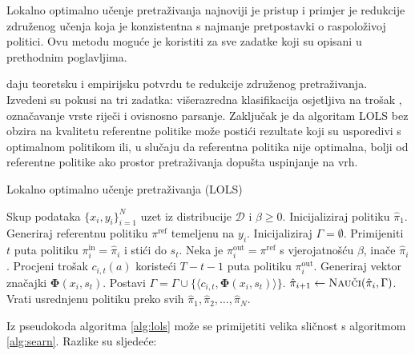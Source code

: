 Lokalno optimalno učenje pretraživanja 
najnoviji je pristup i primjer je redukcije združenog učenja koja je
konzistentna s najmanje pretpostavki o raspoloživoj politici. Ovu metodu moguće je
koristiti za sve zadatke koji su opisani u prethodnim poglavljima.

\cite{daume15lols} daju teoretsku i empirijsku potvrdu te redukcije združenog
pretraživanja. Izvedeni su pokusi na tri zadatka: višerazredna klasifikacija
osjetljiva na trošak ,
označavanje vrste riječi i ovisnosno parsanje. Zaključak je da algoritam
\textsc{LOLS} bez obzira na kvalitetu referentne politike može postići rezultate
koji su usporedivi s optimalnom politikom ili, u slučaju da referentna politika nije
optimalna, bolji od referentne politike ako prostor pretraživanja dopušta
uspinjanje na vrh.

\begin{algorithm}
\caption{Lokalno optimalno učenje pretraživanja (\textsc{LOLS})}\label{alg:lols}
\begin{algorithmic}[1]
\Require Skup podataka $\{x_i, y_i\}_{i=1}^N$ uzet iz distribucije $\mathcal{D}$
         i $\beta \geq 0$. %
\State Inicijaliziraj politiku $\hat{\pi}_1$.
  \State Generiraj referentnu politiku $\pi^{\text{ref}}$ temeljenu na $y_i$.
  \State Inicijaliziraj $\Gamma = \emptyset$. 
    \State Primijeniti $t$ puta politiku $\pi_{i}^{\text{in}} = \hat{\pi}_i$  i stići do $s_t$.  \label{alg:lols:learned}
      \State Neka je  $\pi_{i}^{\text{out}} = \pi^{\text{ref}}$ s vjerojatnošću $\beta$, inače $\hat{\pi}_i$.
      \State Procjeni trošak $c_{i,t}(a)$ koristeći $T-t-1$ puta politiku $\pi_{i}^{\text{out}}$.  \label{alg:lols:mixture}
    \EndFor
    \State Generiraj vektor značajki $\mathbf{\Phi}(x_i, s_t)$.
    \State Postavi $\Gamma = \Gamma \cup \{\langle c_{i,t}, \mathbf{\Phi}(x_i, s_t) \rangle\}$.
  \EndFor
  \State $\hat{\pi}_{i+1} \gets \textsc{Nauči}(\hat{\pi}_i, \Gamma)$.
\EndFor
\State Vrati usrednjenu politiku preko svih $\hat{\pi}_1, \hat{\pi}_2, \ldots, \hat{\pi}_N$.
\end{algorithmic}
\end{algorithm}

Iz pseudokoda algoritma \ref{alg:lols} može se primijetiti velika sličnost s
algoritmom \ref{alg:searn}. Razlike su sljedeće:

